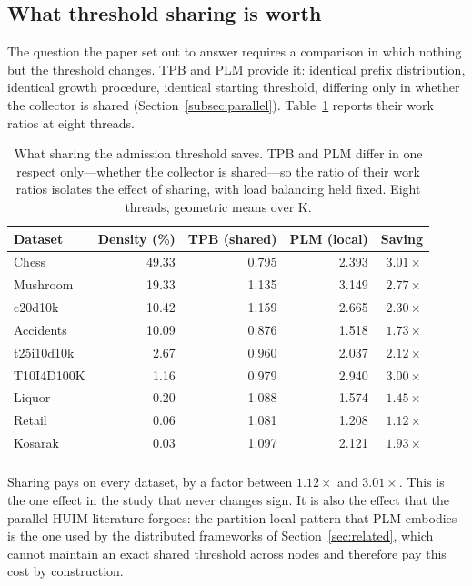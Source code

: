\documentclass[pdflatex,sn-vancouver-num]{sn-jnl}
\theoremstyle{thmstyleone}%
\theoremstyle{thmstyletwo}%
\theoremstyle{thmstylethree}%
\newcommand{\Kk}{\mathrm{K}}
\begin{document}
\subsection{What threshold sharing is worth}\label{subsec:sharing}
 
The question the paper set out to answer requires a comparison in which
nothing but the threshold changes. TPB and PLM provide it: identical
prefix distribution, identical growth procedure, identical starting
threshold, differing only in whether the collector is shared
(Section~\ref{subsec:parallel}). Table~\ref{tab:sharing} reports their
work ratios at eight threads.
 
\begin{table}[t]
\caption{What sharing the admission threshold saves. TPB and PLM differ
in one respect only---whether the collector is shared---so the ratio of
their work ratios isolates the effect of sharing, with load balancing
held fixed. Eight threads, geometric means over $\Kk$.}\label{tab:sharing}
\footnotesize\setlength{\tabcolsep}{6pt}
\begin{tabular}{@{}lrrrr@{}}
\toprule
Dataset & Density (\%) & TPB (shared) & PLM (local) & Saving \\
\midrule
Chess      & 49.33 & 0.795 & 2.393 & $3.01\times$ \\
Mushroom   & 19.33 & 1.135 & 3.149 & $2.77\times$ \\
c20d10k    & 10.42 & 1.159 & 2.665 & $2.30\times$ \\
Accidents  & 10.09 & 0.876 & 1.518 & $1.73\times$ \\
t25i10d10k & 2.67  & 0.960 & 2.037 & $2.12\times$ \\
T10I4D100K & 1.16  & 0.979 & 2.940 & $3.00\times$ \\
Liquor     & 0.20  & 1.088 & 1.574 & $1.45\times$ \\
Retail     & 0.06  & 1.081 & 1.208 & $1.12\times$ \\
Kosarak    & 0.03  & 1.097 & 2.121 & $1.93\times$ \\
\botrule
\end{tabular}
\end{table}
 
Sharing pays on every dataset, by a factor between $1.12\times$ and
$3.01\times$. This is the one effect in the study that never changes
sign. It is also the effect that the parallel HUIM literature forgoes:
the partition-local pattern that PLM embodies is the one used by the
distributed frameworks of Section~\ref{sec:related}, which cannot
maintain an exact shared threshold across nodes and therefore pay this
cost by construction.
 
\end{document}
